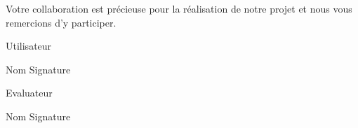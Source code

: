 \documentclass[12pt,a4paper,oneside]{article}
\begin{document}
Votre collaboration est précieuse pour la réalisation de notre projet et nous vous remercions d'y participer.

\vspace{1cm}

Utilisateur

\vspace{0.5cm}

Nom  \underline{\hspace{4.5cm}}
Signature  \underline{\hspace{4.5cm}}

\vspace{1cm}

Evaluateur

\vspace{0.5cm}

Nom  \underline{\hspace{4.5cm}}
Signature  \underline{\hspace{4.5cm}}
\end{document}
